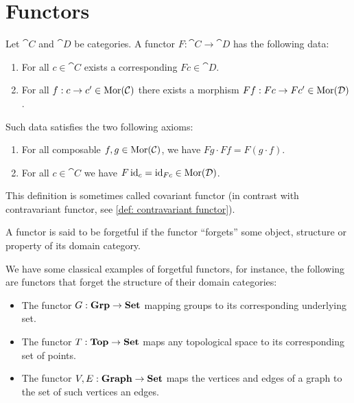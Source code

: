 \section{Functors}

\begin{definition}[Functor]\label{def: functor}
Let \(\cat C\) and \(\cat D\) be categories. A functor \(F: \cat C \to \cat
D\) has the following data:
\begin{enumerate}[({DF}1)]
  \item For all \(c \in \cat C\) exists a corresponding \(F c \in \cat D\).
  \item For all \(f: c \to c' \in \operatorname{Mor}(\mathcal C)\) there exists a morphism \(F
    f: F c \to F c' \in \operatorname{Mor}(\mathcal D)\).
\end{enumerate}
Such data satisfies the two following axioms:
\begin{enumerate}[({AF}1)]
  \item For all composable \(f, g \in \operatorname{Mor}(\mathcal C)\), we have \(F g \cdot F f
    = F (g \cdot f)\).
  \item For all \(c \in \cat C\) we have \(F \operatorname{id}_c = \operatorname{id}_{F c} \in \operatorname{Mor}(\mathcal
    D)\).
\end{enumerate}
This definition is sometimes called covariant functor (in contrast with
contravariant functor, see \cref{def: contravariant functor}).
\end{definition}

\begin{definition}
A functor is said to be forgetful if the functor ``forgets'' some object,
structure or property of its domain category.
\end{definition}

\begin{example}
We have some classical examples of forgetful functors, for instance, the
following are functors that forget the structure of their domain categories:
\begin{itemize}
  \item The functor \(G: {\textbf{Grp}} \to {\textbf{Set}}\) mapping groups to its
    corresponding underlying set.
  \item The functor \(T: {\textbf{Top}} \to {\textbf{Set}}\) maps any topological space
    to its corresponding set of points.
  \item The functor \(V, E: {\textbf{Graph}} \to {\textbf{Set}}\) maps the vertices and
    edges of a graph to the set of such vertices an edges.
\end{itemize}
\end{example}

